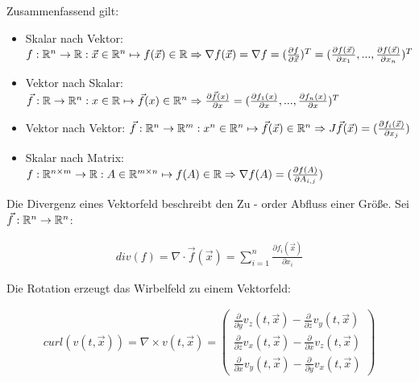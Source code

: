 \begin{definition}
	Zusammenfassend gilt:
	\begin{itemize}[noitemsep]
		\item Skalar nach Vektor: $f : \mathbb{R}^n \rightarrow \mathbb{R} : \vec{x} \in \mathbb{R}^n \mapsto f(\vec{x}) \in \mathbb{R} \Rightarrow \nabla f(\vec{x}) = \nabla f = (\frac{\partial f}{\partial \vec{x}})^T = (\frac{\partial f(\vec{x})}{\partial x_1}, ..., \frac{\partial f(\vec{x})}{\partial x_n})^T$
		\item Vektor nach Skalar: $\vec{f} : \mathbb{R} \rightarrow \mathbb{R}^n : x \in \mathbb{R} \mapsto \vec{f}(x) \in \mathbb{R}^n \Rightarrow \frac{\partial \vec{f}(x)}{\partial x} = (\frac{\partial f_1(x)}{\partial x}, ..., \frac{\partial f_n(x)}{\partial x})^T$  
		\item Vektor nach Vektor:  $\vec{f} : \mathbb{R}^n \rightarrow \mathbb{R}^m : x^n \in \mathbb{R}^n \mapsto \vec{f}(\vec{x}) \in \mathbb{R}^n \Rightarrow J\vec{f} (\vec{x}) = (\frac{\partial f_{i}(\vec{x})}{\partial x_j})$
		\item Skalar nach Matrix: $f : \mathbb{R}^{n \times m} \rightarrow \mathbb{R} : A \in \mathbb{R}^{m \times n} \mapsto f(A) \in \mathbb{R} \Rightarrow \nabla f(A) = (\frac{\partial f(A)}{\partial A_{i, j}})$   
	\end{itemize}
\end{definition}



\begin{definition}[Divergenz]
	Die Divergenz eines Vektorfeld beschreibt den Zu - order Abfluss einer Größe. Sei $\vec{f} : \mathbb{R}^n \rightarrow \mathbb{R}^n$:

	\begin{align*}
	 div(f) = \nabla \cdot \vec{f}(\vec{x}) = \sum_{i = 1}^{n} \frac{\partial f_i (\vec{x}) }{\partial x_i}
	\end{align*}
	
\end{definition}


\begin{definition}[Rotation]
	Die Rotation erzeugt das Wirbelfeld zu einem Vektorfeld:
	
	\begin{align*}
		curl(v(t, \vec{x})) = \nabla \times v(t,\vec{x}) = \begin{pmatrix} \frac{\partial}{\partial y} v_z(t, \vec{x}) - \frac{\partial}{\partial z} v_y(t, \vec{x}) \\
		\frac{\partial}{\partial z} v_x(t, \vec{x}) - \frac{\partial}{\partial x} v_z(t, \vec{x}) \\ \frac{\partial}{\partial x} v_y(t, \vec{x}) - \frac{\partial}{\partial y} v_x(t, \vec{x})
		\end{pmatrix} 
	\end{align*}
\end{definition}


